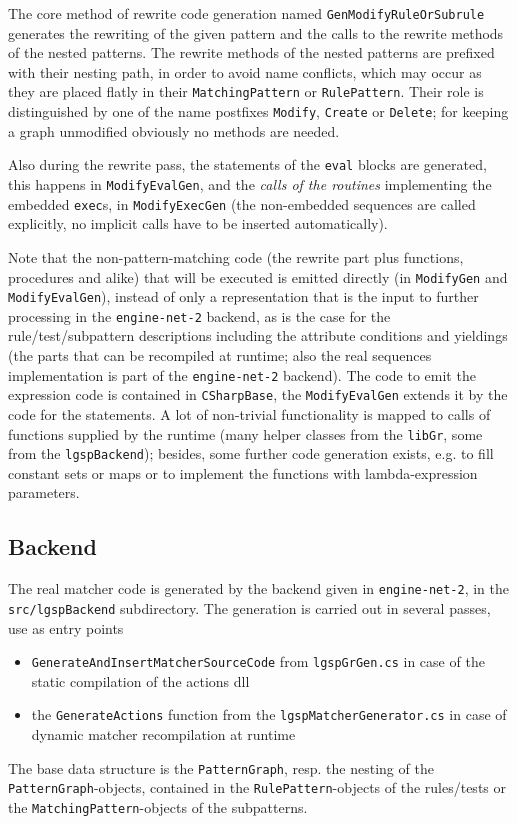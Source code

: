 The core method of rewrite code generation named \texttt{Gen\-Modify\-Rule\-Or\-Subrule} generates the rewriting of the given pattern and the calls to the rewrite methods of the nested patterns.
The rewrite methods of the nested patterns are prefixed with their nesting path, in order to avoid name conflicts, which may occur as they are placed flatly in their \texttt{Matching\-Pattern} or \texttt{Rule\-Pattern}.
Their role is distinguished by one of the name postfixes \texttt{Modify}, \texttt{Create} or \texttt{Delete}; for keeping a graph unmodified obviously no methods are needed.

Also during the rewrite pass, the statements of the \texttt{eval} blocks are generated, this happens in \texttt{Modify\-Eval\-Gen}, and the \emph{calls of the routines} implementing the embedded \texttt{exec}s, in \texttt{Modify\-Exec\-Gen} (the non-embedded sequences are called explicitly, no implicit calls have to be inserted automatically).

Note that the non-pattern-matching code (the rewrite part plus functions, procedures and alike) that will be executed is emitted directly (in \texttt{Modify\-Gen} and \texttt{Modify\-Eval\-Gen}), instead of only a representation that is the input to further processing in the \texttt{engine-net-2} backend, as is the case for the rule/test/subpattern descriptions including the attribute conditions and yieldings (the parts that can be recompiled at runtime; also the real sequences implementation is part of the \texttt{engine-net-2} backend).
The code to emit the expression code is contained in \texttt{CSharp\-Base}, the \texttt{Modify\-Eval\-Gen} extends it by the code for the statements.
A lot of non-trivial functionality is mapped to calls of functions supplied by the runtime (many helper classes from the \texttt{libGr}, some from the \texttt{lgspBackend}); besides, some further code generation exists, e.g. to fill constant sets or maps or to implement the functions with lambda-expression parameters.



\subsection{Backend}

The real matcher code is generated by the backend given in \texttt{engine-net-2}, in the \texttt{src/lgsp\-Backend} subdirectory.
The generation is carried out in several passes, use as entry points
\begin{itemize}
	\item \texttt{Generate\-And\-Insert\-Matcher\-Source\-Code} from \texttt{lgspGrGen.cs} in case of the static compilation of the actions dll
	\item the \texttt{Generate\-Actions} function from the \texttt{lgsp\-Matcher\-Generator.cs} in case of dynamic matcher recompilation at runtime
\end{itemize}
The base data structure is the \texttt{PatternGraph}, resp. the nesting of the \texttt{PatternGraph}-objects, contained in the \texttt{RulePattern}-objects of the rules/tests or the \texttt{Matching\-Pattern}-objects of the subpatterns.


